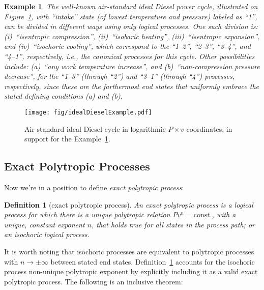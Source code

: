 \documentclass[fleqn,10pt]{SelfArx}
\newtheorem{definition}{Definition}
\newtheorem{example}{Example}
\begin{document}
    \begin{example}\label{ex:ideal.Diesel}
        The   well-known   air-standard   ideal   Diesel    power    cycle,    illustrated    on
        Figure~\ref{fig:cycle.Diesel},  with  ``intake''  state  (of  lowest   temperature   and
        pressure) labeled as ``1'',  can  be  divided  in  different  ways  using  only  logical
        processes.  One  such  division  is:  (i)~``isentropic  compression'',   (ii)~``isobaric
        heating'',  (iii)~``isentropic  expansion'',  and  (iv)~``isochoric   cooling'',   which
        correspond to the ``1--2'', ``2--3'', ``3--4'', and ``4--1'',  respectively,  i.e.,  the
        canonical  processes  for  this  cycle.  Other  possibilities  include:  (a)~``any  work
        temperature increase'', and (b)~``non-compression pressure decrease'', for the  ``1--3''
        (through ``2'') and ``3--1'' (through ``4'') processes, respectively,  since  these  are
        the farthermost end states that uniformly embrace the stated defining conditions (a) and
        (b).
    \end{example}

    \begin{figure}[ht]
        \centering
        \texttt{[image: fig/idealDieselExample.pdf]}
        \caption{Air-standard ideal Diesel cycle in  logarithmic  $P\times  v$  coordinates,  in
            support for the Example~\ref{ex:ideal.Diesel}.}
        \label{fig:cycle.Diesel}
    \end{figure}

    \subsection{Exact Polytropic Processes}

    Now we're in a position to define \emph{exact polytropic process}:

    \begin{definition}[exact polytropic process]\label{def:exact.poly.proc}
        An exact polytropic process is a logical process for which there is a unique  polytropic
        relation $Pv^n = \mbox{const.}$, with a unique, constant exponent $n$, that  holds  true
        for all states in the process path; or an isochoric logical process.
    \end{definition}

    It is worth noting that isochoric processes are equivalent to polytropic processes  with  $n
    \to \pm\infty$ between stated end states. Definition~\ref{def:exact.poly.proc} accounts  for
    the isochoric process non-unique polytropic exponent by explicitly including it as  a  valid
    exact polytropic process. The following is an inclusive theorem:
\end{document}
